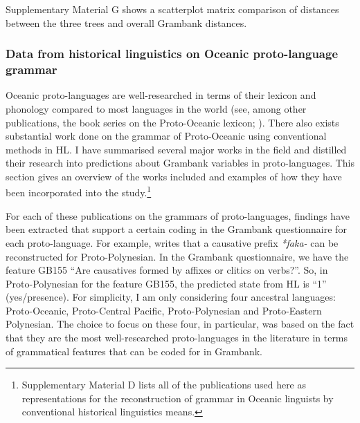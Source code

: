 \documentclass[12pt,letterpaper]{article}
\begin{document}
Supplementary Material G shows a scatterplot matrix comparison of distances between the three trees and overall Grambank distances.

\FloatBarrier
\subsubsection{Data from historical linguistics on Oceanic proto-language grammar}
\label{sec:POC_lit_review}

Oceanic proto-languages are well-researched in terms of their lexicon and phonology compared to most languages in the world (see, among other publications, the book series on the Proto-Oceanic lexicon; \citealt{protooceanicvol1, protooceanicvol2, protooceanicvol3, protooceanicvol4, protooceanicvol5}). There also exists substantial work done on the grammar of Proto-Oceanic using conventional methods in HL. I have summarised several major works in the field and distilled their research into predictions about Grambank variables in proto-languages. This section gives an overview of the works included and examples of how they have been incorporated into the study.\footnote{Supplementary Material D lists all of the publications used here as representations for the reconstruction of grammar in Oceanic linguists by conventional historical linguistics means.}

For each of these publications on the grammars of proto-languages, findings have been extracted that support a certain coding in the Grambank questionnaire for each proto-language. For example, \citet[4]{marck2000_encyclo} writes that a causative prefix \textit{*faka-} can be reconstructed for Proto-Polynesian. In the Grambank questionnaire, we have the feature GB155 ``Are causatives formed by affixes or clitics on verbs?''. So, in Proto-Polynesian for the feature GB155, the predicted state from HL is ``1'' (yes/presence). For simplicity, I am only considering four ancestral languages: Proto-Oceanic, Proto-Central Pacific, Proto-Polynesian and Proto-Eastern Polynesian. The choice to focus on these four, in particular, was based on the fact that they are the most well-researched proto-languages in the literature in terms of grammatical features that can be coded for in Grambank. 

\end{document}

